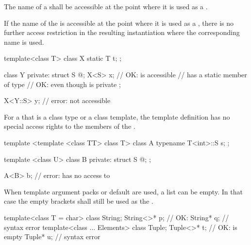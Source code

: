 \pnum
The name of a
shall be accessible at the point where it is used as a
.
\begin{note}
If the name of the
is accessible at the point where it is used as a
,
there is no further access restriction in the resulting instantiation where the
corresponding
name is used.
\end{note}
\begin{example}
\begin{codeblock}
template<class T> class X {
  static T t;
};

class Y {
private:
  struct S { @\commentellip@ };
  X<S> x;           // OK:  is accessible
                    //  has a static member of type 
                    // OK: even though  is private
};

X<Y::S> y;          // error:  not accessible
\end{codeblock}
\end{example}
For a
that is a class type or a class template, the template
definition has no special access rights to the
members of the .
\begin{example}
\begin{codeblock}
template <template <class TT> class T> class A {
  typename T<int>::S s;
};

template <class U> class B {
private:
  struct S { @\commentellip@ };
};

A<B> b;             // error:  has no access to 
\end{codeblock}
\end{example}

\pnum
When template argument packs or default
are used, a
list can be empty.
In that case the empty
\tcode{<>}
brackets shall still be used as the
.
\begin{example}
\begin{codeblock}
template<class T = char> class String;
String<>* p;                    // OK: 
String* q;                      // syntax error
template<class ... Elements> class Tuple;
Tuple<>* t;                     // OK:  is empty
Tuple* u;                       // syntax error
\end{codeblock}
\end{example}

